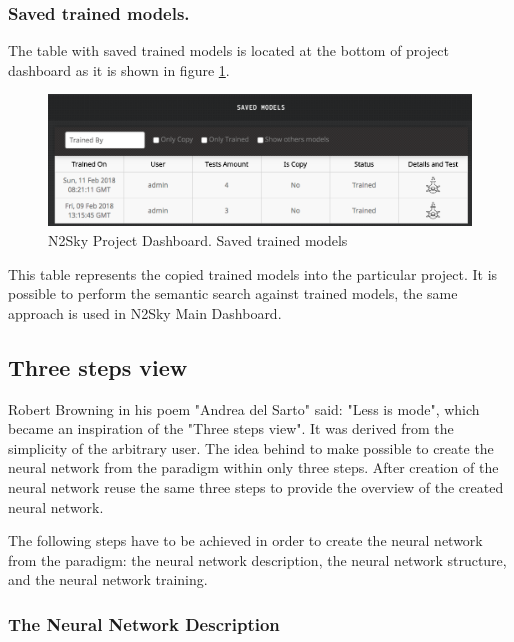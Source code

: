 \begin{itemize}
\subsubsection{Saved trained models.}

The table with saved trained models is located at the bottom of project dashboard as it is shown in figure \ref{fig:saved_trained_models_project}.

\begin{figure}[H]
\begin{center}
  \includegraphics[width=\linewidth]{components/5/img/saved_trained_models_project.png}
  \caption{N2Sky Project Dashboard. Saved trained models}
  \label{fig:saved_trained_models_project}
\end{center}
\end{figure}

This table represents the copied trained models into the particular project. It is possible to perform the semantic search against trained models, the same approach is used in N2Sky Main Dashboard. 

\end{itemize}


\subsection{Three steps view}\label{Three steps view}

Robert Browning in his poem "Andrea del Sarto" said: "Less is mode", which became an inspiration of the "Three steps view". It was derived from the simplicity of the arbitrary user. The idea behind to make possible to create the neural network from the paradigm within only three steps. After creation of the neural network reuse the same three steps to provide the overview of the created neural network.

The following steps have to be achieved in order to create the neural network from the paradigm:  the neural network description, the neural network structure, and the neural network training.

\subsubsection{The Neural Network Description}

